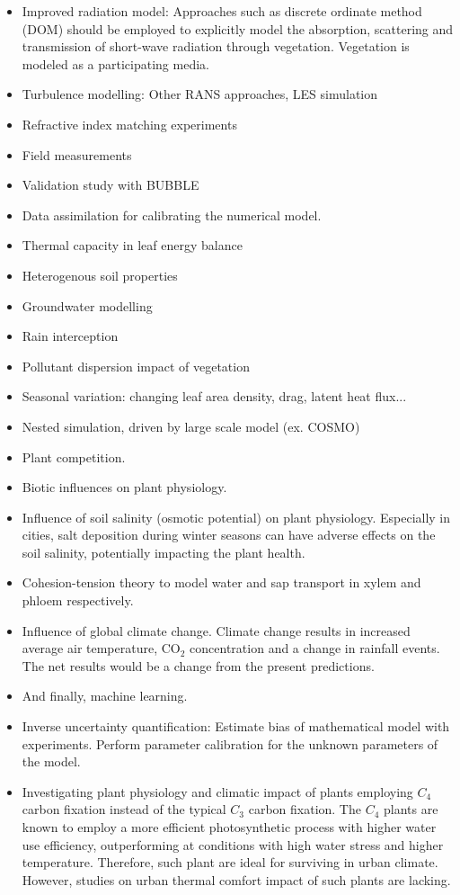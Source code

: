 \begin{itemize}
	\item Improved radiation model: Approaches such as discrete ordinate method (DOM) should be employed to explicitly model the absorption, scattering and transmission of short-wave radiation through vegetation. Vegetation is modeled as a participating media.
	\item Turbulence modelling: Other RANS approaches, LES simulation
	\item Refractive index matching experiments
	\item Field measurements
	\item Validation study with BUBBLE
	\item Data assimilation for calibrating the numerical model.
	\item Thermal capacity in leaf energy balance
	\item Heterogenous soil properties
	\item Groundwater modelling
	\item Rain interception
	\item Pollutant dispersion impact of vegetation
	\item Seasonal variation: changing leaf area density, drag, latent heat flux...
	\item Nested simulation, driven by large scale model (ex. COSMO)
	\item Plant competition.
	\item Biotic influences on plant physiology. 
	\item Influence of soil salinity (osmotic potential) on plant physiology. Especially in cities, salt deposition during winter seasons can have adverse effects on the soil salinity, potentially impacting the plant health. 
	\item Cohesion-tension theory to model water and sap transport in xylem and phloem respectively.
	\item Influence of global climate change. Climate change results in increased average air temperature, CO$_2$ concentration and a change in rainfall events. The net results would be a change from the present predictions. 
	\item And finally, machine learning.
	\item Inverse uncertainty quantification: Estimate bias of mathematical model with experiments. Perform parameter calibration for the unknown parameters of the model.  
	\item Investigating plant physiology and climatic impact of plants employing $C_4$ carbon fixation instead of the typical $C_3$ carbon fixation. The $C_4$ plants are known to employ a more efficient photosynthetic process with higher water use efficiency, outperforming at conditions with high water stress and higher temperature. Therefore, such plant are ideal for surviving in urban climate. However, studies on urban thermal comfort impact of such plants are lacking.
\end{itemize}